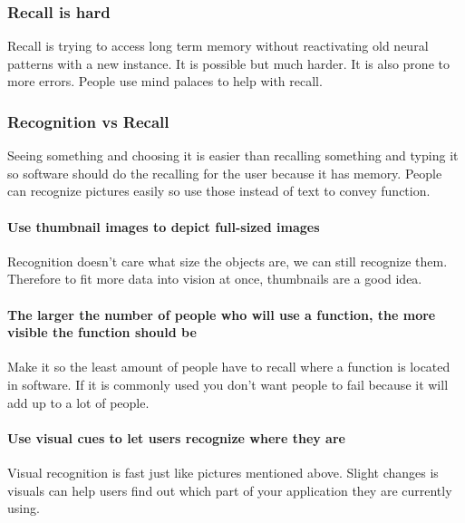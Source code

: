 \documentclass[11pt,]{article}
\let\oldparagraph\paragraph
\renewcommand{\paragraph}[1]{\oldparagraph{#1}\mbox{}}
\begin{document}
\hypertarget{recall-is-hard}{%
\subsubsection{Recall is hard}\label{recall-is-hard}}

Recall is trying to access long term memory without reactivating old
neural patterns with a new instance. It is possible but much harder. It
is also prone to more errors. People use mind palaces to help with
recall.

\hypertarget{recognition-vs-recall}{%
\subsubsection{Recognition vs Recall}\label{recognition-vs-recall}}

Seeing something and choosing it is easier than recalling something and
typing it so software should do the recalling for the user because it
has memory. People can recognize pictures easily so use those instead of
text to convey function.

\hypertarget{use-thumbnail-images-to-depict-full-sized-images}{%
\paragraph{Use thumbnail images to depict full-sized
images}\label{use-thumbnail-images-to-depict-full-sized-images}}

Recognition doesn't care what size the objects are, we can still
recognize them. Therefore to fit more data into vision at once,
thumbnails are a good idea.

\hypertarget{the-larger-the-number-of-people-who-will-use-a-function-the-more-visible-the-function-should-be}{%
\paragraph{The larger the number of people who will use a function, the
more visible the function should
be}\label{the-larger-the-number-of-people-who-will-use-a-function-the-more-visible-the-function-should-be}}

Make it so the least amount of people have to recall where a function is
located in software. If it is commonly used you don't want people to
fail because it will add up to a lot of people.

\hypertarget{use-visual-cues-to-let-users-recognize-where-they-are}{%
\paragraph{Use visual cues to let users recognize where they
are}\label{use-visual-cues-to-let-users-recognize-where-they-are}}

Visual recognition is fast just like pictures mentioned above. Slight
changes is visuals can help users find out which part of your
application they are currently using.
\end{document}
